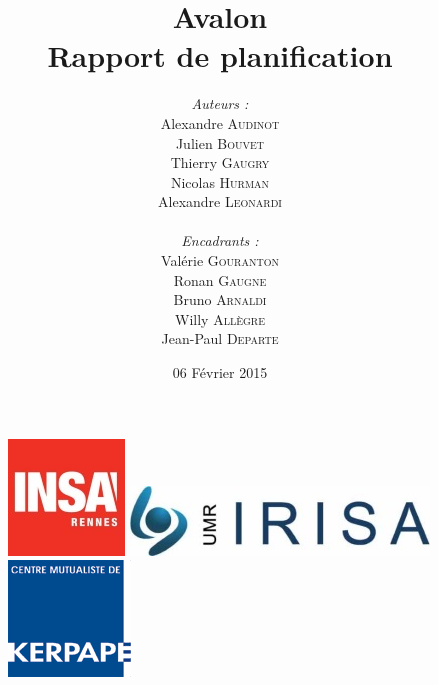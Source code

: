 \documentclass[a4paper,11pt]{article}
\title{
  \textbf{Avalon}\\
  Rapport de planification
}
\author{
\begin{minipage}{0.4\textwidth}
	\begin{flushleft} \large
		\emph{Auteurs :}\\
		Alexandre \textsc{Audinot}\\
		Julien \textsc{Bouvet}\\
		Thierry \textsc{Gaugry}\\
		Nicolas \textsc{Hurman}\\
		Alexandre \textsc{Leonardi}\\
	\end{flushleft}
\end{minipage}
\begin{minipage}{0.4\textwidth}
	\begin{flushright} \large
		\emph{Encadrants :} \\
		Valérie \textsc{Gouranton}\\
		Ronan \textsc{Gaugne}\\
		Bruno \textsc{Arnaldi}\\
		Willy \textsc{Allègre}\\
		Jean-Paul  \textsc{Departe}\\
	\end{flushright}
\end{minipage}
}
\date{06 Février 2015}
\begin{document}
\maketitle
\thispagestyle{empty}

\begin{figure}
   \begin{minipage}{0.3\linewidth}
      \includegraphics[scale=0.9]{3-Planification/img/logo_insa.jpeg}
   \end{minipage} 
   \begin{minipage}{0.2\linewidth}
      \centering
      \includegraphics[scale=0.5,left]{3-Planification/img/logo_irisa.jpg}
   \end{minipage}\hfill
   \begin{minipage}{0.2\linewidth}
      \includegraphics[scale=0.9]{3-Planification/img/logo_kerpape.png}
   \end{minipage}
\end{figure}

\newpage
\tableofcontents
\pagebreak

\setlength{\parskip}{4mm}


\pagebreak

\pagebreak

\pagebreak

\pagebreak

\pagebreak

\end{document}
